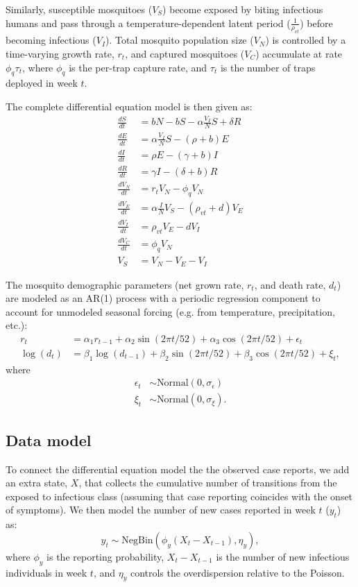\documentclass[10pt,letterpaper]{article}
\begin{document}
Similarly, susceptible mosquitoes ($V_S$) become exposed by biting infectious humans and pass through a temperature-dependent latent period ($\frac{1}{\rho_{vt}}$) before becoming infectious ($V_I$).
Total mosquito population size ($V_N$) is controlled by a time-varying growth rate, $r_t$, and captured mosquitoes ($V_C$) accumulate at rate $\phi_q \tau_t$, where $\phi_q$ is the per-trap capture rate, and $\tau_t$ is the number of traps deployed in week $t$.

The complete differential equation model is then given as:
\begin{align} 
\frac{dS}{dt} &= bN - bS - \alpha \frac{V_{I}}{N} S + \delta R\\
\frac{dE}{dt} &= \alpha \frac{V_{I}}{N} S - (\rho + b)E\\
\frac{dI}{dt} &= \rho E - (\gamma + b)I\\
\frac{dR}{dt} &= \gamma I - (\delta + b)R\\
\frac{dV_N}{dt} & = r_t V_N - \phi_q V_N\\
\frac{dV_E}{dt} &= \alpha \frac{I}{N} V_S - (\rho_{vt} + d)V_E\\
\frac{dV_I}{dt} &= \rho_{vt} V_E - d V_I\\
\frac{dV_C}{dt} & = \phi_q V_N\\
V_S &= V_N - V_E - V_I
\end{align}

The mosquito demographic parameters (net grown rate, $r_t$, and death rate, $d_t$) are modeled as an AR(1) process with a periodic regression component to account for unmodeled seasonal forcing (e.g. from temperature, precipitation, etc.):
\begin{align}
r_t & = \alpha_{1}r_{t-1} + \alpha_2 \sin(2\pi t / 52) + \alpha_3 \cos(2\pi t / 52) + \epsilon_t\\
\log(d_{t}) & = \beta_{1}\log(d_{t-1}) + \beta_2 \sin(2\pi t / 52) + \beta_3 \cos(2\pi t / 52) + \xi_t,
\end{align}
where
\begin{align}
\epsilon_t & \sim \text{Normal}(0, \sigma_{\epsilon})\\
\xi_t & \sim \text{Normal}(0, \sigma_{\xi}).
\end{align}

\subsection*{Data model}

To connect the differential equation model the the observed case reports, we add an extra state, $X$, that collects the cumulative number of transitions from the exposed to infectious class (assuming that case reporting coincides with the onset of symptoms).
We then model the number of new cases reported in week $t$ ($y_t$) as:
\begin{equation}
y_t  \sim \text{NegBin}(\phi_y (X_t - X_{t-1}), \eta_y),
\end{equation}
where $\phi_y$ is the reporting probability, $X_t - X_{t-1}$ is the number of new infectious individuals in week $t$, and $\eta_y$ controls the overdispersion relative to the Poisson.
\end{document}
